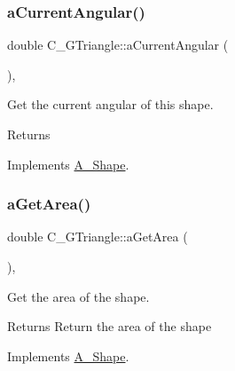 \subsubsection{\texorpdfstring{a\+Current\+Angular()}{aCurrentAngular()}\hspace{0.1cm}{\footnotesize\ttfamily [2/2]}}
{\footnotesize\ttfamily double C\+\_\+\+G\+Triangle\+::a\+Current\+Angular (\begin{DoxyParamCaption}{ }\end{DoxyParamCaption})\hspace{0.3cm}{\ttfamily [override]}, {\ttfamily [virtual]}}



Get the current angular of this shape. 

\begin{DoxyReturn}{Returns}

\end{DoxyReturn}


Implements \hyperlink{classA__Shape_a80fa4e009c875dd0ba7fc5bfeeb43f98}{A\+\_\+\+Shape}.

\mbox{\label{classC__GTriangle_a4d1c9a050aef86a7eab973b1fe668544}} 
\subsubsection{\texorpdfstring{a\+Get\+Area()}{aGetArea()}\hspace{0.1cm}{\footnotesize\ttfamily [1/2]}}
{\footnotesize\ttfamily double C\+\_\+\+G\+Triangle\+::a\+Get\+Area (\begin{DoxyParamCaption}{ }\end{DoxyParamCaption})\hspace{0.3cm}{\ttfamily [override]}, {\ttfamily [virtual]}}



Get the area of the shape. 

\begin{DoxyReturn}{Returns}
Return the area of the shape 
\end{DoxyReturn}


Implements \hyperlink{classA__Shape_a1b142ee2d873d6c217f65de1632e7b6e}{A\+\_\+\+Shape}.

\mbox{\label{classC__GTriangle_a4d1c9a050aef86a7eab973b1fe668544}} 
